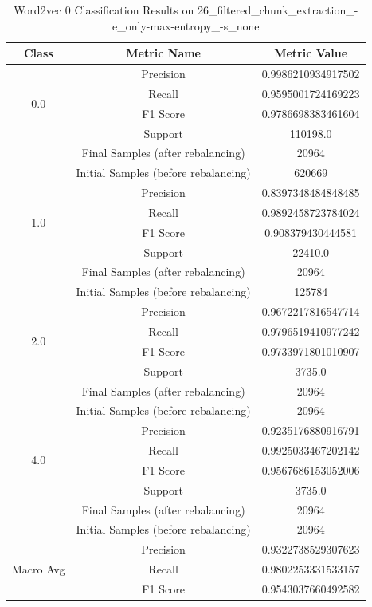 \begin{longtable}{|c|c|c|}
\caption{Word2vec 0 Classification Results on 26\_filtered\_chunk\_extraction\_-e\_only-max-entropy\_-s\_none} \label{tab:26_filtered_chunk_extraction_-e_only-max-entropy_-s_none_word2vec_0_classifiers_results} \\
\hline
Class & Metric Name & Metric Value \\
\hline
\multirow{4}{*}{0.0} & Precision & 0.9986210934917502 \\
 & Recall & 0.9595001724169223 \\
 & F1 Score & 0.9786698383461604 \\
 & Support & 110198.0 \\
 & Final Samples (after rebalancing) & 20964 \\
 & Initial Samples (before rebalancing) & 620669 \\
\hline
\multirow{4}{*}{1.0} & Precision & 0.8397348484848485 \\
 & Recall & 0.9892458723784024 \\
 & F1 Score & 0.908379430444581 \\
 & Support & 22410.0 \\
 & Final Samples (after rebalancing) & 20964 \\
 & Initial Samples (before rebalancing) & 125784 \\
\hline
\multirow{4}{*}{2.0} & Precision & 0.9672217816547714 \\
 & Recall & 0.9796519410977242 \\
 & F1 Score & 0.9733971801010907 \\
 & Support & 3735.0 \\
 & Final Samples (after rebalancing) & 20964 \\
 & Initial Samples (before rebalancing) & 20964 \\
\hline
\multirow{4}{*}{4.0} & Precision & 0.9235176880916791 \\
 & Recall & 0.9925033467202142 \\
 & F1 Score & 0.9567686153052006 \\
 & Support & 3735.0 \\
 & Final Samples (after rebalancing) & 20964 \\
 & Initial Samples (before rebalancing) & 20964 \\
\hline
\multirow{4}{*}{Macro Avg} & Precision & 0.9322738529307623 \\
 & Recall & 0.9802253331533157 \\
 & F1 Score & 0.9543037660492582 \\

\end{longtable}
